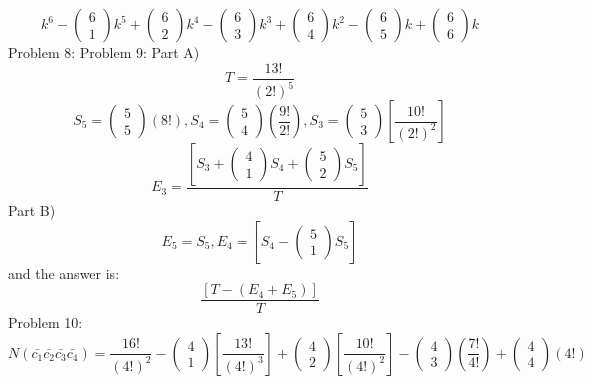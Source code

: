 \documentclass{article}
\begin{document}
$$
k^6
-
\left(\begin{array}{c}
6\\
1
\end{array}\right)
k^5
+
\left(\begin{array}{c}
6\\
2
\end{array}\right)
k^4
-
\left(\begin{array}{c}
6\\
3
\end{array}\right)
k^3
+
\left(\begin{array}{c}
6\\
4
\end{array}\right)
k^2
-
\left(\begin{array}{c}
6\\
5
\end{array}\right)
k
+
\left(\begin{array}{c}
6\\
6
\end{array}\right)
k
$$
Problem 8:
\newline
Problem 9: Part A)
$$
T=\frac{13!}{(2!)^5}
$$
$$
S_5=
\left(\begin{array}{c}
5\\
5
\end{array}\right)
(8!)
,
S_4=
\left(\begin{array}{c}
5\\
4
\end{array}\right)
\left(
\frac{9!}{2!}
\right)
,
S_3=
\left(\begin{array}{c}
5\\
3
\end{array}\right)
\left[
\frac{10!}{(2!)^2}
\right]
$$
$$
E_3=
\frac{
\left[
S_3+
\left(\begin{array}{c}
4\\
1
\end{array}\right)
S_4
+
\left(\begin{array}{c}
5\\
2
\end{array}\right)
S_5
\right]
}{T}
$$
Part B)
$$
E_5=S_5
,
E_4=[S_4-
\left(\begin{array}{c}
5\\
1
\end{array}\right)
S_5
]
$$
and the answer is:
$$
\frac{[T-(E_4+E_5)]}{T}
$$
Problem 10:
$$
N(\bar{c_1}\bar{c_2}\bar{c_3}\bar{c_4})
=
\frac{16!}{(4!)^2}
-
\left(\begin{array}{c}
4\\
1
\end{array}\right)
\left[
\frac{13!}{(4!)^3}
\right]
+
\left(\begin{array}{c}
4\\
2
\end{array}\right)
\left[
\frac{10!}{(4!)^2}
\right]
-
\left(\begin{array}{c}
4\\
3
\end{array}\right)
\left(
\frac{7!}{4!}
\right)
+
\left(\begin{array}{c}
4\\
4
\end{array}\right)
(4!)
$$
\end{document}
